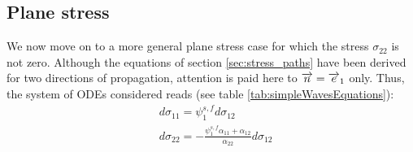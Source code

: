 \subsection{Plane stress}
\label{sec:num_plane_stress}
We now move on to a more general plane stress case for which the stress $\sigma_{22} $ is not zero.
Although the equations of section \ref{sec:stress_paths} have been derived for two directions of propagation, attention is paid here to ${\overrightarrow{n}}={\overrightarrow{e}}_1$ only. 
Thus, the system of ODEs considered reads (see table \ref{tab:simpleWavesEquations}):
\begin{align}
  \label{eq:plane_stress_paths}
  & d\sigma_{11} = \psi_1^{s,f} d\sigma_{12} \\
  & d\sigma_{22} = -\frac{\psi^{s,f}_{1}\alpha_{11}+\alpha_{12}}{\alpha_{22}}d\sigma_{12}
\end{align}

